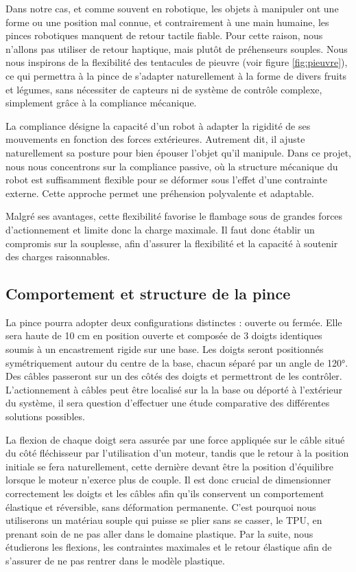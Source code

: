 \documentclass[a4paper, 11pt]{report}
\begin{document}
        Dans notre cas, et comme souvent en robotique, les objets à manipuler ont une forme ou une position mal connue, et contrairement à une main humaine, les pinces robotiques manquent de retour tactile fiable. Pour cette raison, nous n'allons pas utiliser de retour haptique, mais plutôt de préhenseurs souples. Nous nous inspirons de la flexibilité des tentacules de pieuvre (voir figure \ref{fig:pieuvre}), ce qui permettra à la pince de s'adapter naturellement à la forme de divers fruits et légumes, sans nécessiter de capteurs ni de système de contrôle complexe, simplement grâce à la compliance mécanique.
        
        La compliance désigne la capacité d’un robot à adapter la rigidité de ses mouvements en fonction des forces extérieures. Autrement dit, il ajuste naturellement sa posture pour bien épouser l’objet qu’il manipule. Dans ce projet, nous nous concentrons sur la compliance passive, où la structure mécanique du robot est suffisamment flexible pour se déformer sous l'effet d'une contrainte externe. Cette approche permet une préhension polyvalente et adaptable. \cite{noauthor_gestion_2016}

        Malgré ses avantages, cette flexibilité favorise le flambage sous de grandes forces d'actionnement et limite donc la charge maximale. Il faut donc établir un compromis sur la souplesse, afin d'assurer la flexibilité et la capacité à soutenir des charges raisonnables. \cite{wang_spirobs_2025}
    
    \subsection{Comportement et structure de la pince}
    
        La pince pourra adopter deux configurations distinctes : ouverte ou fermée. Elle sera haute de 10 cm en position ouverte et composée de 3 doigts identiques soumis à un encastrement rigide sur une base. Les doigts seront positionnés symétriquement autour du centre de la base, chacun séparé par un angle de 120°. Des câbles passeront sur un des côtés des doigts et permettront de les contrôler. L'actionnement à câbles peut être localisé sur la la base ou déporté à l'extérieur du système, il sera question d'effectuer une étude comparative des différentes solutions possibles.
        
        La flexion de chaque doigt sera assurée par une force appliquée sur le câble situé du côté fléchisseur par l'utilisation d'un moteur, tandis que le retour à la position initiale se fera naturellement, cette dernière devant être la position d'équilibre lorsque le moteur n'exerce plus de couple. Il est donc crucial de dimensionner correctement les doigts et les câbles afin qu'ils conservent un comportement élastique et réversible, sans déformation permanente. C'est pourquoi nous utiliserons un matériau souple qui puisse se plier sans se casser, le TPU, en prenant soin de ne pas aller dans le domaine plastique. Par la suite, nous étudierons les flexions, les contraintes maximales et le retour élastique afin de s'assurer de ne pas rentrer dans le modèle plastique.
                
\end{document}
